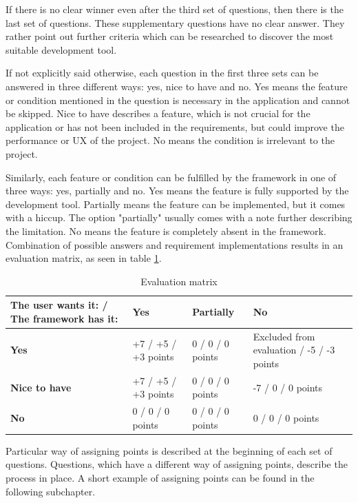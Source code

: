 \documentclass[english,master,public,dept460,male,cpdeclaration,oneside]{diploma}
\begin{document}
If there is no clear winner even after the third set of questions, then there is the last set of questions. These supplementary questions have no clear answer. They rather point out further criteria which can be researched to discover the most suitable development tool.
	
If not explicitly said otherwise, each question in the first three sets can be answered in three different ways: yes, nice to have and no. Yes means the feature or condition mentioned in the question is necessary in the application and cannot be skipped. Nice to have describes a feature, which is not crucial for the application or has not been included in the requirements, but could improve the performance or UX of the project. No means the condition is irrelevant to the project.
	
Similarly, each feature or condition can be fulfilled by the framework in one of three ways: yes, partially and no. Yes means the feature is fully supported by the development tool. Partially means the feature can be implemented, but it comes with a hiccup. The option "partially" usually comes with a note further describing the limitation. No means the feature is completely absent in the framework. Combination of possible answers and requirement implementations results in an evaluation matrix, as seen in table \ref{table:evaluationMatrix}.
	
\begin{table}[!h]
	\centering
	\caption{Evaluation matrix}
	\label{table:evaluationMatrix}
	\begin{tabular}{p{3cm} | p{3cm} | p{3cm} | p{3cm}}
		\toprule
		\textbf{The user wants it: / The framework has it:} & \textbf{Yes} & \textbf{Partially} & \textbf{No} \\
		\midrule
		\textbf{Yes} & +7 / +5 / +3 points & 0 / 0 / 0 points & Excluded from evaluation / -5 / -3 points \\
		\midrule
		\textbf{Nice to have} & +7 / +5 / +3 points & 0 / 0 / 0 points & -7 / 0 / 0 points \\
		\midrule
		\textbf{No} & 0 / 0 / 0 points & 0 / 0 / 0 points &  0 / 0 / 0 points \\
		\midrule	
	\end{tabular}
\end{table}

Particular way of assigning points is described at the beginning of each set of questions. Questions, which have a different way of assigning points, describe the process in place. A short example of assigning points can be found in the following subchapter.
\end{document}
